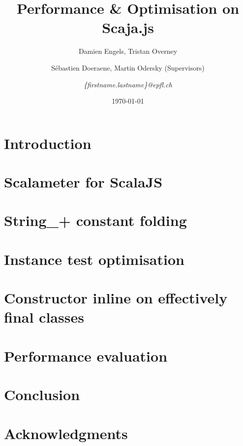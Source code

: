 \documentclass{article}
\begin{document}
\title{Performance \& Optimisation on Scaja.js}
\author{Damien Engels, Tristan Overney\and S\'{e}bastien Doeraene, Martin
Odersky (Supervisors)\and \emph{\{firstname.lastname\}@epfl.ch}}
\date{\today}
\maketitle

\nocite{*}

\section{Introduction}


\section{Scalameter for ScalaJS}


\section{String\_+ constant folding}


\section{Instance test optimisation}


\section{Constructor inline on effectively final classes}


\section{Performance evaluation}


\section{Conclusion}


\section*{Acknowledgments}


{}

\end{document}
